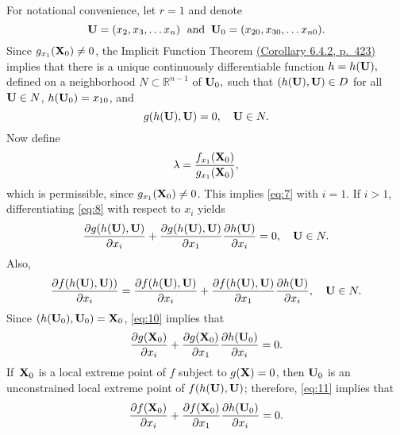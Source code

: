 \documentclass{article}
\newcommand{\proof}{\noindent{\sc\bf Proof}\quad }
\begin{document}
\proof
For notational convenience, let $r=1$ and   denote
$$
{\bf U}=(x_{2},x_{3},\dots x_{n})\text{\; and\;\;}
{\bf U}_{0}=(x_{20},x_{30},\dots x_{n0}).
$$
Since $g_{x_{1}}({\bf X}_{0})\ne0$,  the
Implicit Function Theorem
\href{http://ramanujan.math.trinity.edu/wtrench/texts/TRENCH_REAL_ANALYSIS.PDF}
{(Corollary 6.4.2, p.~423)}
implies
that there is a unique continuously differentiable function
$h=h({\bf U}),$ defined on a neighborhood $N \subset{\mathbb R}^{n-1}$ of
${\bf U}_{0},$  such that $(h({\bf U}),{\bf U})\in D$ for all
${\bf U}\in N$,
 $h({\bf U}_{0})=x_{10}$, and
\begin{equation} \label{eq:8}
g(h({\bf U}),{\bf U})=0,\quad  {\bf U}\in N.
\end{equation}
Now define
\begin{equation} \label{eq:9}
\lambda=\frac{f_{x_{1}}({\bf X}_{0})}{g_{x_{1}}({\bf X}_{0})},
\end{equation}
which is permissible, since  $g_{x_{1}}({\bf X}_{0})\ne0$.
This implies \eqref{eq:7} with $i=1$.
If   $i> 1$,  differentiating \eqref{eq:8} with respect to $x_{i}$ yields
\begin{equation} \label{eq:10}
\frac{\partial g(h({\bf U}),{\bf U})}{{\partial  x_{i}}}+
\frac{\partial g(h({\bf U}),{\bf U})}{{\partial  x_{1}}}
\frac{{\partial h({\bf U})}}{{\partial x_{i}}}=0,\quad {\bf U}\in N.
\end{equation}
Also,
\begin{equation} \label{eq:11}
\frac{\partial f({h(\bf U}),{\bf U}))}{\partial x_{i}}=
\frac{\partial f(h({\bf U}),{\bf U})}{{\partial  x_{i}}}+
\frac{\partial f(h({\bf U}),{\bf U})}{{\partial  x_{1}}}
\frac{{\partial h({\bf U})}}{{\partial x_{i}}},\quad {\bf U}\in N.
\end{equation}
Since $(h({\bf U}_{0}),{\bf U}_{0})={\bf X}_{0}$, \eqref{eq:10}
implies that
\begin{equation} \label{eq:12}
\frac{\partial g({\bf X}_{0})}{{\partial  x_{i}}}+
\frac{\partial g({\bf X}_{0})}{{\partial  x_{1}}}
\frac{{\partial h({\bf U}_{0})}}{{\partial x_{i}}}=0.
\end{equation}
If\,
 ${\bf X}_{0}$ is a local extreme point of  $f$
subject to  $g({\bf X})=0$, then ${\bf U}_{0}$
is an unconstrained local extreme point of $f(h({\bf U}),{\bf U})$;
therefore,
\eqref{eq:11}  implies that
\begin{equation} \label{eq:13}
\frac{\partial f({\bf X}_{0})}{{\partial  x_{i}}}+
\frac{\partial f({\bf X}_{0})}{{\partial  x_{1}}}
\frac{{\partial h({\bf U}_{0})}}{{\partial x_{i}}}=0.
\end{equation}
\end{document}
